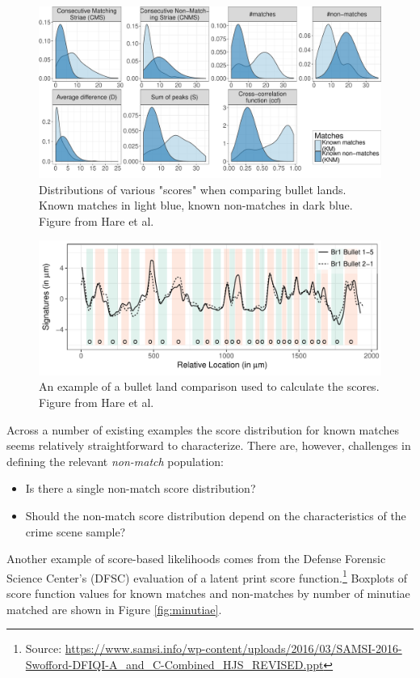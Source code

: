 \documentclass[]{book}
\providecommand{\tightlist}{%
  \setlength{\itemsep}{0pt}\setlength{\parskip}{0pt}}
\let\rmarkdownfootnote\footnote%
\def\footnote{\protect\rmarkdownfootnote}
\theoremstyle{definition}
\theoremstyle{definition}
\theoremstyle{remark}
\begin{document}
\begin{figure}

{\centering \includegraphics[width=.65\linewidth]{img/density-overview-1} 

}

\caption{Distributions of various "scores" when comparing bullet lands. Known matches in light blue, known non-matches in dark blue. Figure from Hare et al.}\label{fig:scorebullet}
\end{figure}

\begin{figure}

{\centering \includegraphics[width=.65\linewidth]{img/smoothmatch-1} 

}

\caption{An example of a bullet land comparison used to calculate the scores. Figure from Hare et al.}\label{fig:comparebullet}
\end{figure}

Across a number of existing examples the score distribution for known
matches seems relatively straightforward to characterize. There are,
however, challenges in defining the relevant \emph{non-match}
population:

\begin{itemize}
\tightlist
\item
  Is there a single non-match score distribution?
\item
  Should the non-match score distribution depend on the characteristics
  of the crime scene sample?
\end{itemize}

Another example of score-based likelihoods comes from the Defense
Forensic Science Center's (DFSC) evaluation of a latent print score
function.\footnote{Source:
  \url{https://www.samsi.info/wp-content/uploads/2016/03/SAMSI-2016-Swofford-DFIQI-A_and_C-Combined_HJS_REVISED.ppt}}
Boxplots of score function values for known matches and non-matches by
number of minutiae matched are shown in Figure \ref{fig:minutiae}.
\end{document}
